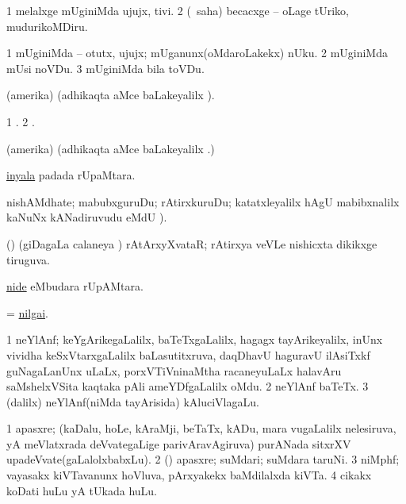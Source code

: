 \bentry
{}
\gl{\sakirx}
\bmng
\bnum
\num{1} melalxge mUginiMda ujujx, tivi. 
\num{2} (\AtAmx\ saha) becacxge -- oLage tUriko, mudurikoMDiru. 
\enum
\emng

\noindent
\gl{\akirx}
\bmng
\bnum
\num{1} mUginiMda -- otutx, ujujx; mUganunx(oMdaroLakekx) nUku. 
\num{2} mUginiMda mUsi noVDu. 
\num{3} mUginiMda bila toVDu. 
\enum
\emng
\eentry

\bentry
{}
\gl{\saMkiSx}
\bmng
(amerika)  (adhikaqta aMce baLakeyalilx \parx). 
\emng
\eentry

\bentry
{}
\gl{\saMkiSx}
\bmng
\bnum
\num{1} . 
\num{2} . 
\enum
\emng
\eentry

\bentry
{}
\gl{\saMkiSx}
\bmng
(amerika)  (adhikaqta aMce baLakeyalilx \parx.) 
\emng
\eentry

\bentry
{}
\gl{\nA}
\bmng
\hyperref{kandict_i.pdf}{I}{inyala}{inyala} padada rUpaMtara. 
\emng
\eentry

\bentry
{}
\gl{\saMkiSx}
\bmng
{} 
\emng
\eentry

\bentry
{}
\gl{\nA}
\bmng
nishAMdhate; mabubxguruDu; rAtirxkuruDu; katatxleyalilx hAgU mabibxnalilx kaNuNx kANadiruvudu  eMdU \parx). 
\emng
\eentry

\bentry
{}
\gl{\gu}
\bmng
(\savi) (giDagaLa calaneya \vi) rAtArxyXvataR; rAtirxya veVLe nishicxta dikikxge tiruguva. 
\emng
\eentry

\bentry
{}
\gl{\nA}
\bmng
\hyperlink{nide}{nide} eMbudara rUpAMtara. 
\emng
\eentry

\bentry
{}
\gl{\nA}
\bmng
= \hyperlink{nilgai}{nilgai}. 
\emng
\eentry

\bentry
{}
\gl{\nA}
\bmng
\bnum
\num{1} neYlAnf; keYgArikegaLalilx, baTeTxgaLalilx, hagagx tayArikeyalilx, inUnx vividha keSxVtarxgaLalilx baLasutitxruva, daqDhavU haguravU ilAsiTxkf guNagaLanUnx uLaLx, porxVTiVninaMtha racaneyuLaLx halavAru saMshelxVSita kaqtaka pAli ameYDfgaLalilx oMdu. 
\num{2} neYlAnf baTeTx. 
\num{3} (\bava dalilx) neYlAnf(niMda tayArisida) kAluciVlagaLu. 
\enum
\emng
\eentry

\bentry
{}
\gl{\nA}
\bmng
\bnum
\num{1} apasxre; (kaDalu, hoLe, kAraMji, beTaTx, kADu, mara \mo vugaLalilx nelesiruva, yA meVlatxrada deVvategaLige parivAravAgiruva) purANada sitxrXV upadeVvate(gaLalolxbabxLu). 
\num{2} (\kAparx) apasxre; suMdari; suMdara taruNi. 
\num{3} niMphf; vayasakx kiVTavanunx hoVluva, pArxyakekx baMdilalxda kiVTa. 
\num{4} cikakx koDati huLu yA tUkada huLu. 
\enum
\emng
\eentry

